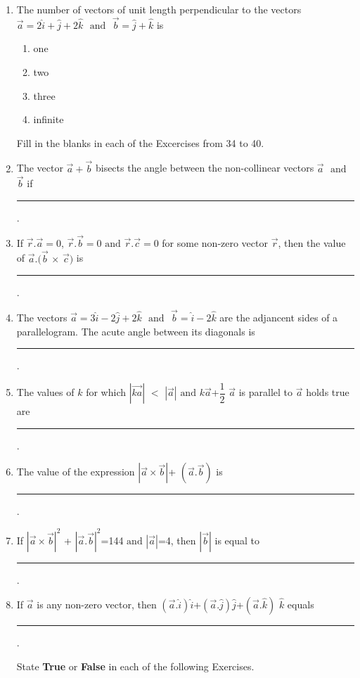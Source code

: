 \documentclass{article}
\providecommand{\abs}[1]{\left\vert#1\right\vert}
\begin{document}
\begin{enumerate}
\item The number of vectors of unit length perpendicular to the vectors $\vec{a}=2\hat{i}+\hat{j}+2\hat{k}$ $\text{ and }$ $\vec{b}=\hat{j}+\hat{k}$ is
	\begin{enumerate}
\item one
\item  two
\item three
\item infinite
\end{enumerate}

\begin{flushleft}Fill in the blanks in each of the Excercises from 34 to 40.\end{flushleft}

\item The vector $\vec{a}+\vec{b}$ bisects the angle between the non-collinear vectors $\vec{a}$ $\text{ and }$ $\vec{b}$ if \rule{1cm}{0.15mm}.


\item If $\vec{r}.\vec{a}=0$, $\vec{r}.\vec{b}=0$ $\text{and}$ $\vec{r}.\vec{c}=0$ for some non-zero vector $\vec{r}$, then the value of $\vec{a}.(\vec{b}$ $\times$ $\vec{c})$ is \rule{1cm}{0.15mm}.


\item The vectors $\vec{a}=3\hat{i}-2\hat{j}+2\hat{k}$ $\text{ and }$ $\vec{b}=\hat{i}-2\hat{k}$ are the adjancent sides of a parallelogram. The acute angle between its diagonals is \rule{1cm}{0.15mm}.


\item The values of $k$ for which $\abs{\vec{ka}}$ $<$ $\abs{\vec{a}}$ $\text{and}$ $k\vec{a}$+$\dfrac{1}{2}$ $\vec{a}$ is parallel to $\vec{a}$ holds true are \rule{1cm}{0.15mm}.


\item The value of the expression $\abs{\vec{a}\times\vec{b}}$+ $({\vec{a}.\vec{b}})$ is \rule{1cm}{0.15mm}.


\item If $\abs{\vec{a}\times\vec{b}}^2$ + $\abs{\vec{a}.\vec{b}}^2$=144 $\text{and}$  $\abs{\vec{a}}$=4, then $\abs{\vec{b}}$ is equal to \rule{1cm}{0.15mm}.


\item If $\vec{a}$ is  any non-zero vector, then $(\vec{a}.\hat{i})\hat{i}$+$(\vec{a}.\hat{j})\hat{j}$+$(\vec{a}.\hat{k})$ $\hat{k}$ equals \rule{1cm}{0.15mm}.


\raggedright State \textbf{True} or \textbf{False} in each of the following Exercises.



\end{enumerate}
\end{document}
